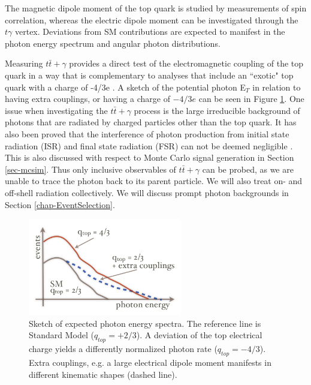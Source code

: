 The magnetic dipole moment of the top quark is studied by measurements of spin correlation, whereas the electric dipole moment can be investigated through the $t\gamma$ vertex. Deviations from SM contributions are expected to manifest in the photon energy spectrum and angular photon distributions.

Measuring $t\bar{t}+\gamma$ provides a direct test of the electromagnetic coupling of the top quark in a way that is complementary to analyses that include an ``exotic" top quark with a charge of -4/3e \cite{top-charge}. A sketch of the potential photon E$_T$ in relation to having extra couplings, or having a charge of $-4/3e$ can be seen in Figure \ref{fig-TopChargeSketch}. One issue when investigating the $t\bar{t}+\gamma$ process is the large irreducible background of photons that are radiated by charged particles other than the top quark. It has also been proved that the interference of photon production from initial state radiation (ISR) and final state radiation (FSR) can not be deemed negligible \cite{topchargemeasurement}. This is also discussed with respect to Monte Carlo signal generation in Section \ref{sec-mcsim}. Thus only inclusive observables of $t\bar{t}+\gamma$ can be probed, as we are unable to trace the photon back to its parent particle. We will also treat on- and off-shell radiation collectively. We will discuss prompt photon backgrounds in Section \ref{chap-EventSelection}. 

\begin{figure} 
\begin{center}
\includegraphics[width=0.6\textwidth]{Figures/TopChargeHeiner.png}
\end{center}
\caption{Sketch of expected photon energy spectra. The reference line is Standard Model ($q_{top} = +2/3$). A deviation of the top electrical charge yields a differently normalized photon rate ($q_{top} = −4/3$). Extra couplings, e.g. a large electrical dipole moment manifests in different kinematic shapes (dashed line). \cite{heinerthesis}}
\label{fig-TopChargeSketch}
\end{figure}


